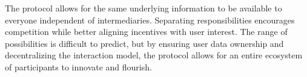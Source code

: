 \documentclass[12pt,letterpaper]{article}
\begin{document}
The protocol allows for the same underlying information to be available to everyone
independent of intermediaries. Separating responsibilities encourages competition while
better aligning incentives with user interest. The range of possibilities is difficult to
predict, but by ensuring user data ownership and decentralizing the interaction model, the
protocol allows for an entire ecosystem of participants to innovate and flourish.

\nocite{0xwhitepaper}
\nocite{al-dahhan2019}
\nocite{al-dahhan2019}
\nocite{ateniese2006a}
\nocite{bünz2020}
\nocite{cheng2020}
\nocite{diebold2017}
\nocite{eip1078}
\nocite{eip173}
\nocite{eip712}
\nocite{ethereumyellow}
\nocite{ge2019}
\nocite{gnosissafe}
\nocite{green2018}
\nocite{henry2018}
\nocite{json-web-encryption}
\nocite{nacl}
\nocite{nakamoto}
\nocite{omara2020}
\nocite{openzeppelin}
\nocite{pirk}
\nocite{raikwar2019}
\nocite{swarm}
\nocite{ugander2011}
\nocite{unilogin}
\nocite{whisper}
\nocite{williams2019}

\printbibliography
\end{document}
